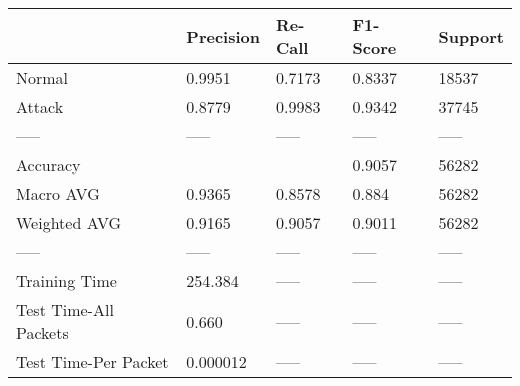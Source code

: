 \begin{tabular}{lllll}
\toprule
{} & Precision & Re-Call & F1-Score & Support \\
\midrule
Normal                &    0.9951 &  0.7173 &   0.8337 &   18537 \\
Attack                &    0.8779 &  0.9983 &   0.9342 &   37745 \\
-----                 &     ----- &   ----- &    ----- &   ----- \\
Accuracy              &           &         &   0.9057 &   56282 \\
Macro AVG             &    0.9365 &  0.8578 &    0.884 &   56282 \\
Weighted AVG          &    0.9165 &  0.9057 &   0.9011 &   56282 \\
-----                 &     ----- &   ----- &    ----- &   ----- \\
Training Time         &   254.384 &   ----- &    ----- &   ----- \\
Test Time-All Packets &     0.660 &   ----- &    ----- &   ----- \\
Test Time-Per Packet  &  0.000012 &   ----- &    ----- &   ----- \\
\bottomrule
\end{tabular}
